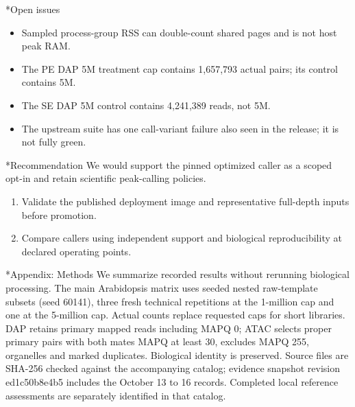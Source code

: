 \documentclass[10pt,letterpaper]{article}
\makeatletter
\renewcommand\section{\@startsection{section}{1}{\z@}{9pt}{4pt}{\large\bfseries}}
\makeatother
\begin{document}
\section*{Open issues}
\begin{itemize}
\item Sampled process-group RSS can double-count shared pages and is not host peak RAM.
\item The PE DAP 5M treatment cap contains 1,657,793 actual pairs; its control contains 5M.
\item The SE DAP 5M control contains 4,241,389 reads, not 5M.
\item The upstream suite has one call-variant failure also seen in the release; it is not fully green.
\end{itemize}
\section*{Recommendation}
We would support the pinned optimized caller as a scoped opt-in and retain scientific peak-calling policies.

\begin{enumerate}
\item Validate the published deployment image and representative full-depth inputs before promotion.
\item Compare callers using independent support and biological reproducibility at declared operating points.
\end{enumerate}
\section*{Appendix: Methods}
We summarize recorded results without rerunning biological processing. The main Arabidopsis matrix uses seeded nested raw-template subsets (seed 60141), three fresh technical repetitions at the 1-million cap and one at the 5-million cap. Actual counts replace requested caps for short libraries. DAP retains primary mapped reads including MAPQ 0; ATAC selects proper primary pairs with both mates MAPQ at least 30, excludes MAPQ 255, organelles and marked duplicates. Biological identity is preserved. Source files are SHA-256 checked against the accompanying catalog; evidence snapshot revision ed1c50b8e4b5 includes the October 13 to 16 records. Completed local reference assessments are separately identified in that catalog.
\end{document}

